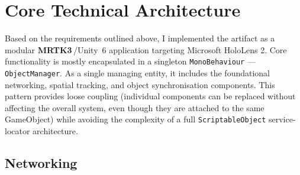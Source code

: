 \section{Core Technical Architecture}
Based on the requirements outlined above, I implemented the artifact as a modular \textbf{MRTK3}\,/Unity~6 application targeting Microsoft HoloLens 2.  
Core functionality is mostly encapsulated in a singleton \texttt{MonoBehaviour} —\texttt{ObjectManager}. As a single managing entity, it includes the foundational networking, spatial tracking, and object synchronisation components. This pattern provides loose coupling (individual components can be replaced without affecting the overall system, even though they are attached to the same GameObject) while avoiding the complexity of a full \texttt{ScriptableObject} service-locator architecture.

\subsection{Networking}\label{subsec:networking}

\begingroup
  \setlength{\tabcolsep}{4pt}
  \renewcommand{\arraystretch}{1.05}

